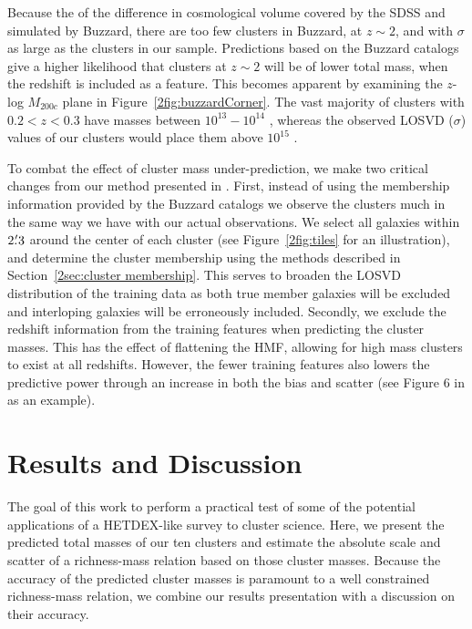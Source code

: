 Because the of the difference in cosmological volume covered by the SDSS and simulated by Buzzard, there are too few clusters in Buzzard, at $z\sim2$, and with $\sigma$ as large as the clusters in our sample. Predictions based on the Buzzard catalogs give a higher likelihood that clusters at $z\sim2$ will be of lower total mass, when the redshift is included as a feature. This becomes apparent by examining the $z$-log $M_{200c}$ plane in Figure~\ref{2fig:buzzardCorner}. The vast majority of clusters with $0.2< z <0.3$ have masses between $10^{13} - 10^{14}$ \Msol, whereas the observed LOSVD ($\sigma$) values of our clusters would place them above $10^{15}$ \Msol. 

To combat the effect of cluster mass under-prediction, we make two critical changes from our method presented in . First, instead of using the membership information provided by the Buzzard catalogs we observe the clusters much in the same way we have with our actual observations. We select all galaxies within $2\mbox{\ensuremath{.\mkern-4mu^\prime}}3$ around the center of each cluster (see Figure~\ref{2fig:tiles} for an illustration), and determine the cluster membership using the methods described in Section~\ref{2sec:cluster membership}. This serves to broaden the LOSVD distribution of the training data as both true member galaxies will be excluded and interloping galaxies will be erroneously included. Secondly, we exclude the redshift information from the training features when predicting the cluster masses. This has the effect of flattening the HMF, allowing for high mass clusters to exist at all redshifts. However, the fewer training features also lowers the predictive power through an increase in both the bias and scatter (see Figure 6 in  as an example). 

\section{Results and Discussion}\label{2sec:results}
The goal of this work to perform a practical test of some of the potential applications of a HETDEX-like survey to cluster science. Here, we present the predicted total masses of our ten clusters and estimate the absolute scale and scatter of a richness-mass relation based on those cluster masses. Because the accuracy of the predicted cluster masses is paramount to a well constrained richness-mass relation, we combine our results presentation with a discussion on their accuracy. 
 
